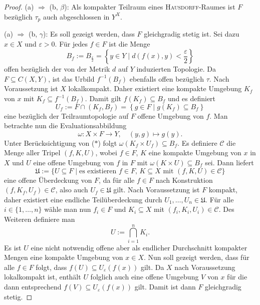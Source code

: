 \begin{proof}
  (a) $\Rightarrow$ (b, $\beta$):  
  Als kompakter Teilraum eines \textsc{Hausdorff}\hyp{}Raumes ist $F$ bezüglich $\tau_p$ auch abgeschlossen in $Y^X$.

  (a) $\Rightarrow$ (b, $\gamma$):
  Es soll gezeigt werden, dass $F$ gleichgradig stetig ist.
  Sei dazu $x \in X$ und $\varepsilon > 0$.
  Für jedes $f \in F$ ist die Menge
  \begin{displaymath}
    B_f := B_{\frac{\varepsilon}{2}} = \left\{ y \in Y \mid d(f(x),y) < \frac{\varepsilon}{2}\right\} 
  \end{displaymath}
  offen bezüglich der von der Metrik $d$ auf $Y$ induzierten Topologie.
  Da $F \subseteq C(X,Y)$, ist das Urbild $f^{-1}(B_f)$ ebenfalls offen bezüglich $\tau$.
  Nach Voraussetzung ist $X$ lokalkompakt.
  Daher existiert eine kompakte Umgebung $K_f$ von $x$ mit $K_f \subseteq f^{-1}(B_f)$.
  Damit gilt $f(K_f) \subseteq B_f$ und es definiert
  \begin{displaymath}
    U_f := F \cap (K_f, B_f) = \left\{g \in F \mid g(K_f) \subseteq B_f \right\} \tag{$\ast$}
  \end{displaymath}
  eine bezüglich der Teilraumtopologie auf $F$ offene Umgebung von $f$.
  Man betrachte nun die Evaluationsabbildung 
  \begin{displaymath}
    \omega: X \times F \to Y, \quad (y,g) \mapsto g(y).
  \end{displaymath}
  Unter Berücksichtigung von ($\ast$) folgt $\omega(K_f \times U_f) \subseteq B_f$.
  Es definiere $\mathcal{C}$ die Menge aller Tripel $(f,K,U)$, wobei $f \in F$, $K$ eine kompakte Umgebung von $x$ in $X$ und $U$ eine offene Umgebung von $f$ in $F$ mit $\omega(K \times U) \subseteq B_f$ sei.
  Dann liefert
  \begin{displaymath}
    \mathfrak{U} := \{ U \subseteq F \mid \text{es existieren $f \in F$, $K \subseteq X$ mit $(f,K,U) \in \mathcal C$} \}
  \end{displaymath}
  eine offene Überdeckung von $F$, da für alle $f \in F$ nach Konstruktion $(f,K_f,U_f) \in \mathcal{C}$, also auch $U_f \in \mathfrak{U}$ gilt.
  Nach Voraussetzung ist $F$ kompakt, daher existiert eine endliche Teilüberdeckung durch $U_1,\dots,U_n \in \mathfrak{U}$.
  Für alle $i \in \{ 1,\dots,n\}$ wähle man nun $f_i \in F$ und $K_i \subseteq X$ mit $(f_i, K_i, U_i) \in \mathcal{C}$.
  Des Weiteren definiere man 
  \begin{displaymath}
    U := \bigcap_{i = 1}^n K_i.
  \end{displaymath}
  Es ist $U$ eine nicht notwendig offene aber als endlicher Durchschnitt kompakter Mengen eine kompakte Umgebung von $x \in X$.
  Nun soll gezeigt werden, dass für alle $f \in F$ folgt, dass $f(U) \subseteq U_\varepsilon(f(x))$ gilt.
  Da $X$ nach Voraussetzung lokalkompakt ist, enthält $U$ folglich auch eine offene Umgebung $V$ von $x$ für die dann entsprechend $f(V) \subseteq U_\varepsilon(f(x))$ gilt.
  Damit ist dann $F$ gleichgradig stetig.


\end{proof}
